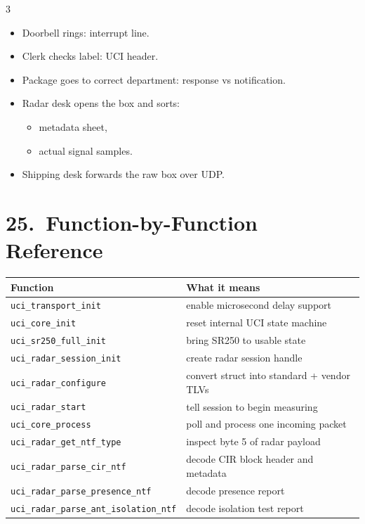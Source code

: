 \documentclass[10pt]{article}
\begin{document}
\begin{multicols*}{3}
\begin{tcolorbox}[analogybox={Analogy --- Warehouse Receiving}]
\begin{itemize}
  \item Doorbell rings: interrupt line.
  \item Clerk checks label: UCI header.
  \item Package goes to correct department: response vs notification.
  \item Radar desk opens the box and sorts:
  \begin{itemize}
    \item metadata sheet,
    \item actual signal samples.
  \end{itemize}
  \item Shipping desk forwards the raw box over UDP.
\end{itemize}
\end{tcolorbox}

\section*{25.\ Function-by-Function Reference}

\begin{tabular}{@{}p{2.7cm}p{4.3cm}@{}}
\toprule
Function & What it means \\
\midrule
\texttt{uci\_transport\_init} & enable microsecond delay support \\
\texttt{uci\_core\_init} & reset internal UCI state machine \\
\texttt{uci\_sr250\_full\_init} & bring SR250 to usable state \\
\texttt{uci\_radar\_session\_init} & create radar session handle \\
\texttt{uci\_radar\_configure} & convert struct into standard + vendor TLVs \\
\texttt{uci\_radar\_start} & tell session to begin measuring \\
\texttt{uci\_core\_process} & poll and process one incoming packet \\
\texttt{uci\_radar\_get\_ntf\_type} & inspect byte 5 of radar payload \\
\texttt{uci\_radar\_parse\_cir\_ntf} & decode CIR block header and metadata \\
\texttt{uci\_radar\_parse\_presence\_ntf} & decode presence report \\
\texttt{uci\_radar\_parse\_ant\_isolation\_ntf} & decode isolation test report \\
\bottomrule
\end{tabular}


\end{multicols*}
\end{document}
